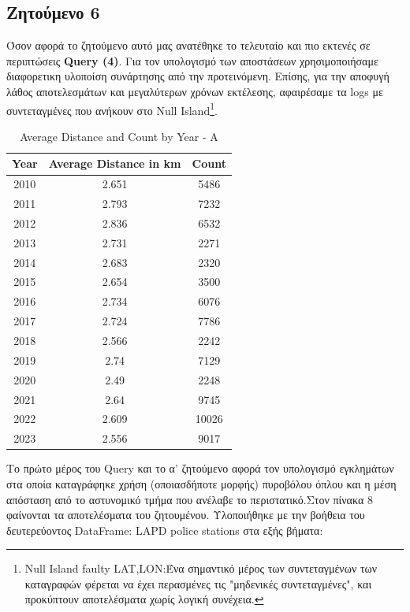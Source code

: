 \documentclass{article}
\begin{document}


\subsection*{Ζητούμενο 6}
\label{subsec:Z6}

Όσον αφορά το ζητούμενο αυτό μας ανατέθηκε το τελευταίο και πιο εκτενές σε περιπτώσεις  \textbf{Query (4)}. Για τον υπολογισμό των αποστάσεων χρησιμοποιήσαμε διαφορετικη υλοποίση συνάρτησης από την προτεινόμενη. Επίσης, για την αποφυγή λάθος αποτελεσμάτων και μεγαλύτερων χρόνων εκτέλεσης, αφαιρέσαμε τα  logs  με συντεταγμένες που ανήκουν στο  Null Island\footnote{Null Island faulty LAT,LON:Ένα σημαντικό μέρος των συντεταγμένων των καταγραφών φέρεται να έχει περασμένες τις "μηδενικές συντεταγμένες", και προκύπτουν αποτελέσματα χωρίς λογική συνέχεια.}.\\
\begin{table}[h]
\centering
\begin{tabular}{|c|c|c|}
\hline
Year & Average Distance in km & Count \\ \hline
2010 & 2.651 & 5486 \\ \hline
2011 & 2.793 & 7232 \\ \hline
2012 & 2.836 & 6532 \\ \hline
2013 & 2.731 & 2271 \\ \hline
2014 & 2.683 & 2320 \\ \hline
2015 & 2.654 & 3500 \\ \hline
2016 & 2.734 & 6076 \\ \hline
2017 & 2.724 & 7786 \\ \hline
2018 & 2.566 & 2242 \\ \hline
2019 & 2.74  & 7129 \\ \hline
2020 & 2.49  & 2248 \\ \hline
2021 & 2.64  & 9745 \\ \hline
2022 & 2.609 & 10026 \\ \hline
2023 & 2.556 & 9017 \\ \hline
\end{tabular}
\caption{Average Distance and Count by Year - A}
\label{table:average_distance_counta}
\end{table}
\clearpage
{}
Το πρώτο μέρος του  Query  και το α' ζητούμενο αφορά τον υπολογισμό εγκλημάτων στα οποία καταγράφηκε χρήση (οποιασδήποτε μορφής) πυροβόλου όπλου και η μέση απόσταση από το αστυνομικό τμήμα που ανέλαβε το περιστατικό.Στον πίνακα 8 φαίνονται τα αποτελέσματα του ζητουμένου. Υλοποιήθηκε με την βοήθεια του δευτερεύοντος  DataFrame: LAPD police stations  στα εξής βήματα:
\end{document}
